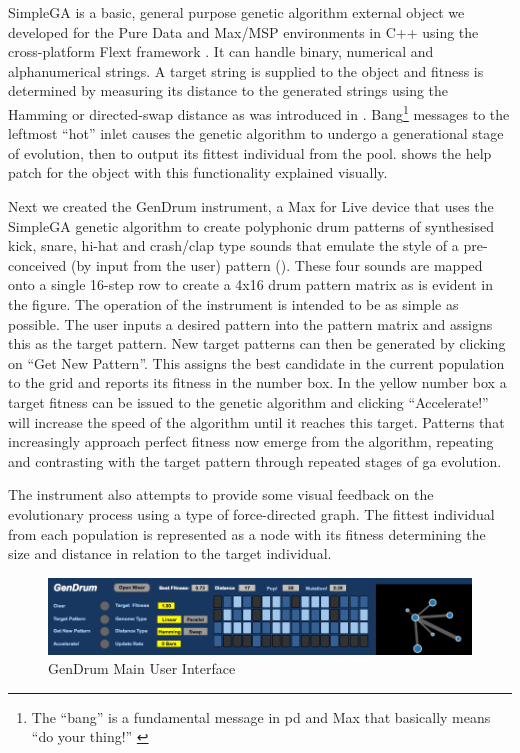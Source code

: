 SimpleGA is a basic, general purpose genetic algorithm external object we developed for the Pure Data \citep{Puckette1997} and Max/MSP environments in C++ using the cross-platform Flext framework \citep{Grill} . It can handle binary, numerical and alphanumerical strings. A target string is supplied to the object and fitness is determined by measuring its distance to the generated strings using the Hamming or directed-swap distance as was introduced in . Bang\footnote{The ``bang'' is a fundamental message in \acrshort{pd} and Max that basically means ``do your thing!'' \citep{winkler2001composing}} messages to the leftmost ``hot'' inlet causes the genetic algorithm to undergo a generational stage of evolution, then to output its fittest individual from the pool.  shows the help patch for the object with this functionality explained visually.

Next we created the GenDrum instrument, a Max for Live device that uses the SimpleGA genetic algorithm to create polyphonic drum patterns of synthesised kick, snare, hi-hat and crash/clap type sounds that emulate the style of a pre-conceived (by input from the user) pattern (). These four sounds are mapped onto a single 16-step row to create a 4x16 drum pattern matrix as is evident in the figure. The operation of the instrument is intended to be as simple as possible. The user inputs a desired pattern into the pattern matrix and assigns this as the target pattern. New target patterns can then be generated by clicking on ``Get New Pattern''. This assigns the best candidate in the current population to the grid and reports its fitness in the number box. In the yellow number box a target fitness can be issued to the genetic algorithm and clicking ``Accelerate!'' will increase the speed of the algorithm until it reaches this target. Patterns that increasingly approach perfect fitness now emerge from the algorithm, repeating and contrasting with the target pattern through repeated stages of \acrshort{ga} evolution.

The instrument also attempts to provide some visual feedback on the evolutionary process using a type of force-directed graph. The fittest individual from each population is represented as a node with its fitness determining the size and distance in relation to the target individual.

\begin{figure}
	\begin{center}
		\includegraphics[width=\figSizeHundred]{ch03_symbolic/figures/gendrum.png}
	\end{center}
	\caption[GenDrum Main User Interface]{GenDrum Main User Interface}
	\label{fig:gendrum}
\end{figure}

